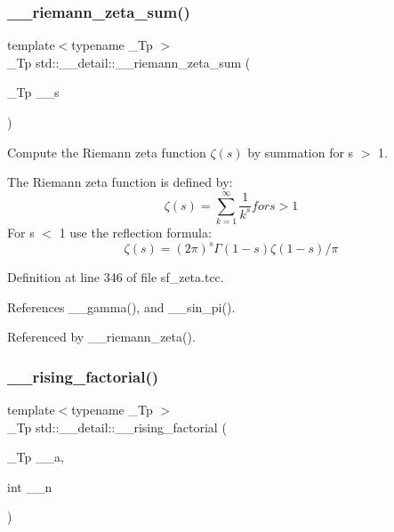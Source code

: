\subsubsection{\texorpdfstring{\+\_\+\+\_\+riemann\+\_\+zeta\+\_\+sum()}{\_\_riemann\_zeta\_sum()}}
{\footnotesize\ttfamily template$<$typename \+\_\+\+Tp $>$ \\
\+\_\+\+Tp std\+::\+\_\+\+\_\+detail\+::\+\_\+\+\_\+riemann\+\_\+zeta\+\_\+sum (\begin{DoxyParamCaption}\item[{\+\_\+\+Tp}]{\+\_\+\+\_\+s }\end{DoxyParamCaption})}



Compute the Riemann zeta function $ \zeta(s) $ by summation for s $>$ 1. 

The Riemann zeta function is defined by\+: \[ \zeta(s) = \sum_{k=1}^{\infty} \frac{1}{k^{s}} for s > 1 \] For s $<$ 1 use the reflection formula\+: \[ \zeta(s) = (2\pi)^s \Gamma(1-s) \zeta(1-s) / \pi \] 

Definition at line 346 of file sf\+\_\+zeta.\+tcc.



References \+\_\+\+\_\+gamma(), and \+\_\+\+\_\+sin\+\_\+pi().



Referenced by \+\_\+\+\_\+riemann\+\_\+zeta().

\mbox{\label{namespacestd_1_1____detail_a5a4c41ee568639f8de4508051da9954a}} 
\subsubsection{\texorpdfstring{\+\_\+\+\_\+rising\+\_\+factorial()}{\_\_rising\_factorial()}\hspace{0.1cm}{\footnotesize\ttfamily [1/2]}}
{\footnotesize\ttfamily template$<$typename \+\_\+\+Tp $>$ \\
\+\_\+\+Tp std\+::\+\_\+\+\_\+detail\+::\+\_\+\+\_\+rising\+\_\+factorial (\begin{DoxyParamCaption}\item[{\+\_\+\+Tp}]{\+\_\+\+\_\+a,  }\item[{int}]{\+\_\+\+\_\+n }\end{DoxyParamCaption})}




